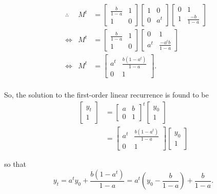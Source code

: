 \documentclass[MathsNotesBase.tex]{subfiles}
\begin{document}
{		 \begin{align*}
		 &\therefore & M^t &= 
		 	\begin{bmatrix}\frac{b}{1 - a} & 1\\1 & 0\end{bmatrix} 
		 	\begin{bmatrix}1 & 0\\0 & a^t\end{bmatrix}
		 	\begin{bmatrix}0 & 1\\1 & \frac{-b}{1 - a}\end{bmatrix} \\
		 &\iff & M^t &= 
		 	\begin{bmatrix}\frac{b}{1 - a} & 1\\1 & 0\end{bmatrix}
		 	\begin{bmatrix}0 & 1\\a^t & \frac{-a^t b}{1 - a}\end{bmatrix} \\
		 &\iff & M^t &= 
		 	\begin{bmatrix}a^t & \frac{b(1 - a^t)}{1 - a}\\0 & 1\end{bmatrix}. \\
		 \end{align*}
		 
		 So, the solution to the first-order linear recurrence is found to be
		 \begin{align*}
		 \begin{bmatrix}
		 y_t\\
		 1
		 \end{bmatrix} &=
		 \begin{bmatrix}
		 a & b\\
		 0 & 1
		 \end{bmatrix}^t
		 \begin{bmatrix}
		 y_0\\
		 1
		 \end{bmatrix} \\
		 &= \begin{bmatrix}a^t & \frac{b(1 - a^t)}{1 - a}\\0 & 1\end{bmatrix} 
		 \begin{bmatrix}
		 y_0\\
		 1
		 \end{bmatrix}
		 \end{align*}
		 
		 so that 
		 \[ y_t = a^t y_0 + \frac{b(1 - a^t)}{1 - a} = a^t\left(y_0 - \frac{b}{1 - a}\right) + \frac{b}{1 - a}. \]
	
}
\end{document}
